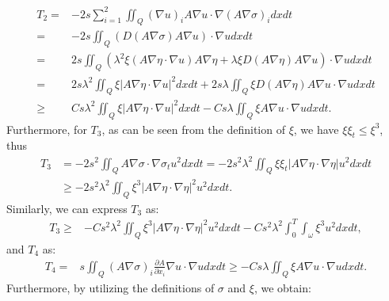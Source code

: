\documentclass[9pt,reqno]{amsart}
\theoremstyle{plain}
\numberwithin{equation}{section}
\numberwithin{theorem}{section}
\begin{document}
	\begin{equation}\label{T2}
		\begin{aligned}
			T_2 =&-2s \sum_{i=1}^{2} \iint_{Q} (\nabla u)_i A \nabla u \cdot \nabla (A \nabla \sigma)_i dx dt\\
			=&-2s \iint_{Q}( D(A\nabla \sigma) A\nabla u) \cdot \nabla u dx  dt\\
			=&2s \iint_{Q}( \lambda^2 \xi (A\nabla \eta \cdot \nabla u) A\nabla \eta + \lambda \xi D(A\nabla \eta) A\nabla u ) \cdot \nabla u dx  dt\\
			=&2s \lambda^2\iint_{Q}  \xi \left|  A\nabla \eta \cdot \nabla u \right| ^2 dx  dt  + 2s\lambda \iint_{Q}\xi D(A\nabla \eta) A\nabla u  \cdot \nabla u dx  dt\\
			\ge& Cs \lambda^2\iint_{Q}  \xi \left|  A\nabla \eta \cdot \nabla u \right| ^2 dx  dt  - C s\lambda \iint_{Q}\xi A\nabla u  \cdot \nabla u dx  dt.
		\end{aligned}
	\end{equation}
	Furthermore, for $T_3$, as can be seen from the definition of $\xi$, we have $\xi \xi_t \le \xi^3$, thus
	\begin{equation*}
		\begin{aligned}
			T_3 &=-2 s^2 \iint_{Q} A\nabla \sigma \cdot \nabla \sigma_t u^2 dx dt
			=-2 s^2 \lambda^2 \iint_{Q} \xi \xi_t \left|A \nabla \eta \cdot \nabla \eta \right|  u^2 dx dt\\
			&\ge-2 s^2 \lambda^2 \iint_{Q} \xi^3 \left|A \nabla \eta \cdot \nabla \eta \right|^2  u^2 dx dt.
		\end{aligned}
	\end{equation*}
	Similarly, we can express $T_3$ as:
	\begin{equation}\label{T3}
		\begin{aligned}
			T_3
			\ge &-C s^2 \lambda^2 \iint_{Q} \xi^3 \left|A \nabla \eta \cdot \nabla \eta \right|^2  u^2 dx dt -C s^2 \lambda^2 \int_{0}^{T}\int_{\omega} \xi^3   u^2 dx dt,
		\end{aligned}
	\end{equation}
	and $T_4$ as:
	\begin{equation}\label{T4}
		\begin{aligned}
			T_4 =&s \iint_{Q} (A\nabla \sigma)_i \frac{\partial A}{\partial x_i} \nabla u \cdot \nabla u dx dt
			\ge  -C s \lambda \iint_Q  \xi A \nabla u \cdot \nabla u dx  dt.
		\end{aligned}
	\end{equation}
	Furthermore, by utilizing the definitions of $\sigma$ and $\xi$, we obtain:
\end{document}
